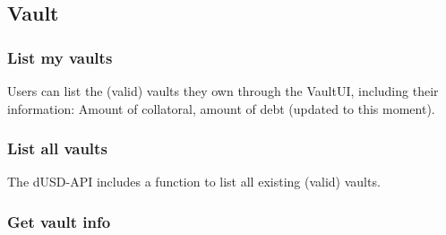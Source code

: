 \documentclass{article} %
\begin{document}
% 
% 
% 
% 
% 
% 
% 
% 
% 
% 
% 
\subsection{Vault}

\subsubsection*{List my vaults}

Users can list the (valid) vaults they own through the VaultUI, including their
information: Amount of collatoral, amount of debt (updated to this moment).

\subsubsection*{List all vaults}

The dUSD-API includes a function to list all existing (valid) vaults.

\subsubsection*{Get vault info}
\end{document}
